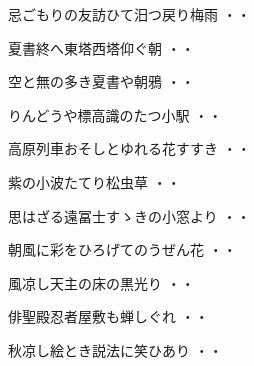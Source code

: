 \vspace{0.6cm}
\begin{shiika}忌ごもりの友訪ひて汨つ戻り梅雨
\hfill{・・}\end{shiika}
\vspace{0.6cm}
\begin{shiika}夏書終へ東塔西塔仰ぐ朝
\hfill{・・}\end{shiika}
\vspace{0.6cm}
\begin{shiika}空と無の多き夏書や朝鴉
\hfill{・・}\end{shiika}
\vspace{0.6cm}
\begin{shiika}りんどうや標高識のたつ小駅
\hfill{・・}\end{shiika}
\vspace{0.6cm}
\begin{shiika}高原列車おそしとゆれる花すすき
\hfill{・・}\end{shiika}
\vspace{0.6cm}
\begin{shiika}紫の小波たてり松虫草
\hfill{・・}\end{shiika}
\vspace{0.6cm}
\begin{shiika}思はざる遠冨士すゝきの小窓より
\hfill{・・}\end{shiika}
\vspace{0.6cm}
\begin{shiika}朝風に彩をひろげてのうぜん花
\hfill{・・}\end{shiika}
\vspace{0.6cm}
\begin{shiika}風凉し天主の床の黒光り
\hfill{・・}\end{shiika}
\vspace{0.6cm}
\begin{shiika}俳聖殿忍者屋敷も蝉しぐれ
\hfill{・・}\end{shiika}
\vspace{0.6cm}
\begin{shiika}秋凉し絵とき説法に笑ひあり
\hfill{・・}\end{shiika}
